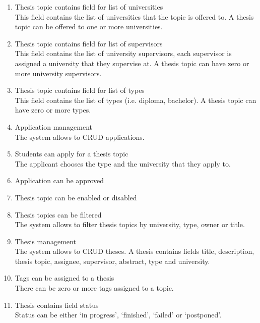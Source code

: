 \begin{enumerate}
    \item Thesis topic contains field for list of universities\\
    This field contains the list of universities that the topic is offered to. A thesis topic can be offered to one or more universities.

    \item Thesis topic contains field for list of supervisors\\
    This field contains the list of university supervisors, each supervisor is assigned a university that they supervise at. A thesis topic can have zero or more university supervisors.

    \item Thesis topic contains field for list of types\\
    This field contains the list of types (i.e. diploma, bachelor). A thesis topic can have zero or more types.

    \item Application management\\
    The system allows to CRUD applications.

    \item Students can apply for a thesis topic\\
    The applicant chooses the type and the university that they apply to.

    \item Application can be approved

    \item Thesis topic can be enabled or disabled

    \item Thesis topics can be filtered\\
    The system allows to filter thesis topics by university, type, owner or title.

    \item Thesis management\\
    The system allows to CRUD theses. A thesis contains fields title, description, thesis topic, assignee, supervisor, abstract, type and university.

    \item Tags can be assigned to a thesis\\
    There can be zero or more tags assigned to a topic.

    \item Thesis contains field status\\
    Status can be either `in progress', `finished', `failed' or `postponed'.


\end{enumerate}

